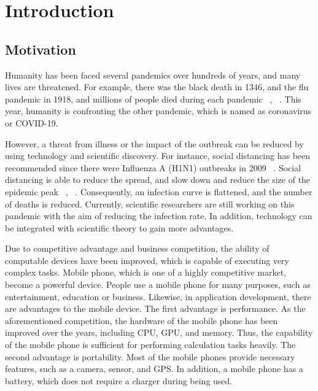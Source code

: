 \chapter{Introduction}\label{intro}
    \section{Motivation}

        Humanity has been faced several pandemics over hundreds of years, and many lives are threatened.
        For example, there was the black death in 1346, and the flu pandemic in 1918, and millions of people died during each pandemic ~\cite{REF1-02}, ~\cite{REF1-01}.
        This year, humanity is confronting the other pandemic, which is named as coronavirus or COVID-19.

        However, a threat from illness or the impact of the outbreak can be reduced by using technology and scientific discovery.
        For instance, social distancing has been recommended since there were Influenza A (H1N1) outbreaks in 2009 ~\cite{REF1-05}.
        Social distancing is able to reduce the spread, and slow down and reduce the size of the epidemic peak ~\cite{REF1-03}, ~\cite{REF1-04}.
        Consequently, an infection curve is flattened, and the number of deaths is reduced.
        Currently, scientific researchers are still working on this pandemic with the aim of reducing the infection rate.
        In addition, technology can be integrated with scientific theory to gain more advantages.

        Due to competitive advantage and business competition, the ability of computable devices have been improved, which is capable of executing very complex tasks.
        Mobile phone, which is one of a highly competitive market, become a powerful device.
        People use a mobile phone for many purposes, such as entertainment, education or business.
        Likewise, in application development, there are advantages to the mobile device.
        The first advantage is performance.
            As the aforementioned competition, the hardware of the mobile phone has been improved over the years, including CPU, GPU, and memory.
            Thus, the capability of the mobile phone is sufficient for performing calculation tasks heavily.
        The second advantage is portability.
            Most of the mobile phones provide necessary features, such as a camera, sensor, and GPS.
            In addition, a mobile phone has a battery, which does not require a charger during being used.


